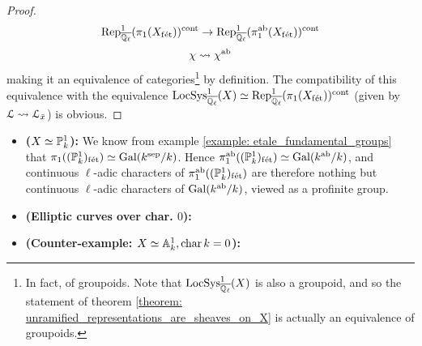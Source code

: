 \begin{proof}
                    $$\Rep^1_{\overline{\Q_{\ell}}}(\pi_1(X_{\fet}))^{\cont} \to \Rep^1_{\overline{\Q_{\ell}}}(\pi_1^{\ab}(X_{\fet}))^{\cont}$$
                    $$\chi \mapsto \chi^{\ab}$$
                making it an equivalence of categories\footnote{In fact, of groupoids. Note that $\LocSys_{\overline{\Q_{\ell}}}^1(X)$ is also a groupoid, and so the statement of theorem \ref{theorem: unramified_representations_are_sheaves_on_X} is actually an equivalence of groupoids.} by definition. The compatibility of this equivalence with the equivalence $\LocSys^1_{\overline{\Q_{\ell}}}(X) \cong \Rep^1_{\overline{\Q_{\ell}}}(\pi_1(X_{\fet}))^{\cont}$ (given by $\calL \mapsto \calL_{\bar{x}}$) is obvious.
            \end{proof}
        \begin{example}
            \noindent
            \begin{itemize}
                \item \textbf{($X \cong \P^1_k$):} We know from example \ref{example: etale_fundamental_groups} that $\pi_1((\P^1_k)_{\fet}) \cong \Gal(k^{\sep}/k)$. Hence $\pi_1^{\ab}((\P^1_k)_{\fet}) \cong \Gal(k^{\ab}/k)$, and continuous $\ell$-adic characters of $\pi_1^{\ab}((\P^1_k)_{\fet})$ are therefore nothing but continuous $\ell$-adic characters of $\Gal(k^{\ab}/k)$, viewed as a profinite group.
                \item \textbf{(Elliptic curves over char. $0$):}
                \item \textbf{(Counter-example: $X \cong \A^1_k, \chara k = 0$):}
            \end{itemize}
        \end{example}
